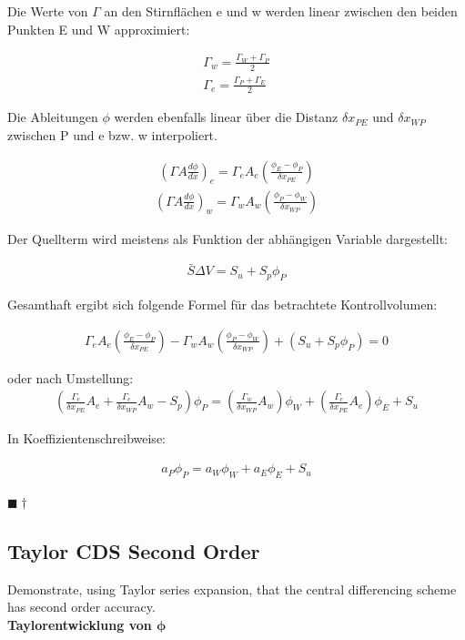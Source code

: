 \documentclass[a4paper]{scrartcl}
\newcommand{\qed}{\begin{flushright}
$\blacksquare \dagger$ \end{flushright}}
\begin{document}
Die Werte von $\Gamma$ an den Stirnflächen e und w werden linear zwischen den
beiden Punkten E und W approximiert:

\begin{align}
\Gamma_w=\frac{\Gamma_W+\Gamma_P}{2} \\
\Gamma_e=\frac{\Gamma_P+\Gamma_E}{2}
\end{align}

Die Ableitungen $\phi$ werden ebenfalls linear über die Distanz $\delta x_{PE}$
und $\delta x_{WP}$ zwischen P und e bzw. w interpoliert.

\begin{align}
\left(\Gamma A \frac{d\phi}{dx}\right)_e = \Gamma_e A_e
\left(\frac{\phi_E - \phi_P}{\delta x_{PE}}\right)
\end{align}
\begin{align}
\left(\Gamma A \frac{d\phi}{dx}\right)_w = \Gamma_w A_w
\left(\frac{\phi_P - \phi_W}{\delta x_{WP}}\right)
\end{align}

Der Quellterm wird meistens als Funktion der abhängigen Variable dargestellt:

\begin{align}
\bar{S}\Delta V = S_u+S_p\phi_P
\end{align}


Gesamthaft ergibt sich folgende Formel für das betrachtete Kontrollvolumen:

\begin{align}
\Gamma_e A_e \left(\frac{\phi_E-\phi_P}{\delta x_{PE}}\right)-\Gamma_w A_w
\left(\frac{\phi_P-\phi_W}{\delta x_{WP}}\right)+(S_u+S_p\phi_P)=0
\end{align}

oder nach Umstellung:
\begin{align}
\boxed{\left(\frac{\Gamma_e}{\delta x_{PE}}A_e + \frac{\Gamma_e}{\delta
x_{WP}} A_w -S_p\right)\phi_P=\left(\frac{\Gamma_w}{\delta x_{WP}}A_w\right)
\phi_W + \left(\frac{\Gamma_e}{\delta x_{PE}}A_e\right)\phi_E+S_u}
\end{align}

In Koeffizientenschreibweise:

\begin{align}
\boxed{a_P\phi_P=a_W\phi_W+a_E\phi_E+S_u}
\end{align}

\qed
\subsection{Taylor CDS Second Order}
Demonstrate, using Taylor series expansion, that the central differencing scheme
has second order accuracy.\\
\textbf{Taylorentwicklung von $\mathbf{\phi}$} \\
\end{document}
